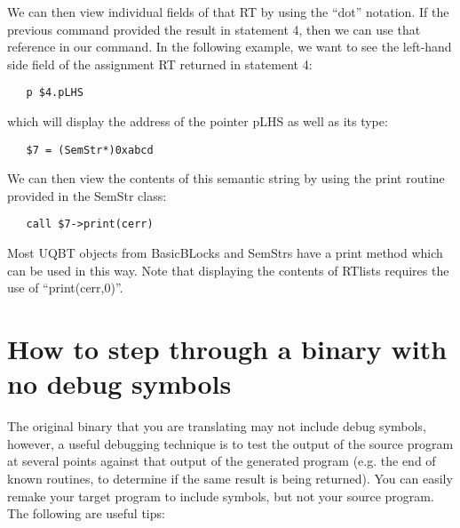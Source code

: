 We can then view individual fields of that RT by using the ``dot'' 
notation.  If the previous command provided the result in statement 4, 
then we can use that reference in our command.  In the following 
example, we want to see the left-hand side field of the assignment RT 
returned in statement 4: 
\begin{verbatim}
   p $4.pLHS
\end{verbatim}
which will display the address of the pointer pLHS as well as its type: 
\begin{verbatim}
   $7 = (SemStr*)0xabcd
\end{verbatim}
We can then view the contents of this semantic string by using the 
print routine provided in the SemStr class: 
\begin{verbatim}
   call $7->print(cerr)
\end{verbatim}
Most UQBT objects from BasicBLocks and SemStrs have a print method 
which can be used in this way.  Note that displaying the contents of 
RTlists requires the use of ``print(cerr,0)''. 


\section{How to step through a binary with no debug symbols}
The original binary that you are translating may not include debug symbols,
however, a useful debugging technique is to test the output of the source 
program at several points against that output of the generated program 
(e.g. the end of known routines, to determine if the same result is being 
returned).  You can easily remake your target program to include symbols, 
but not your source program.  The following are useful tips: 

